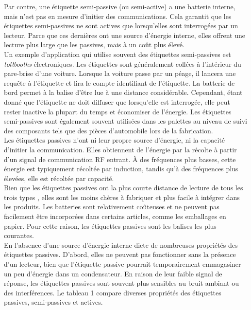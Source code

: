 \documentclass[11pt, a4paper, twoside]{book}
\begin{document}
Par contre, une étiquette semi-passive (ou semi-active) a une batterie interne, mais n'est pas en mesure d'initier des communications. Cela garantit que les étiquettes semi-passives ne sont actives que lorsqu'elles sont interrogées par un lecteur. Parce que ces dernières ont une source d'énergie interne, elles offrent une lecture plus large que les passives, mais à un coût plus élevé.\\


Un exemple d'application qui utilise souvent des étiquettes semi-passives est \emph {tollbooths} électroniques. Les étiquettes sont généralement collées à l'intérieur du pare-brise d'une voiture. Lorsque la voiture passe par un péage, il lancera une requête à l'étiquette et lira le compte identifiant de l'étiquette. La batterie de bord permet à la balise d'être lue à une distance considérable. Cependant, étant donné que l'étiquette ne doit diffuser que lorsqu'elle est interrogée, elle peut rester inactive la plupart du temps et économiser de l'énergie. Les étiquettes semi-passives sont également souvent utilisées dans les palettes au niveau de suivi des composants tels que des pièces d'automobile lors de la fabrication.\\


Les étiquettes passives n'ont ni leur propre source d'énergie, ni la capacité d'initier la communication. Elles obtiennent de l'énergie par la récolte à partir d'un signal de communication RF entrant. À des fréquences plus basses, cette énergie est typiquement récoltée par induction, tandis qu'à des fréquences plus élevées, elle est récoltée par capacité.\\

Bien que les étiquettes passives ont la plus courte distance de lecture de tous les trois types , elles sont les moins chères à fabriquer et plus facile à intégrer dans les produits. Les batteries sont relativement coûteuses et ne peuvent pas facilement être incorporées dans certains articles, comme les emballages en papier. Pour cette raison, les étiquettes passives sont les balises les plus courantes.\\

En l'absence d'une source d'énergie interne dicte de nombreuses propriétés des étiquettes passives. D'abord, elles ne peuvent pas fonctionner sans la présence d'un lecteur, bien que l'étiquette passive pourrait temporairement emmagasiner  un peu d'énergie dans un condensateur. En raison de leur faible signal de réponse, les étiquettes passives sont souvent plus sensibles au bruit ambiant ou des interférences. Le tableau 1 compare diverses propriétés des étiquettes passives, semi-passives et actives.\\
\end{document}
